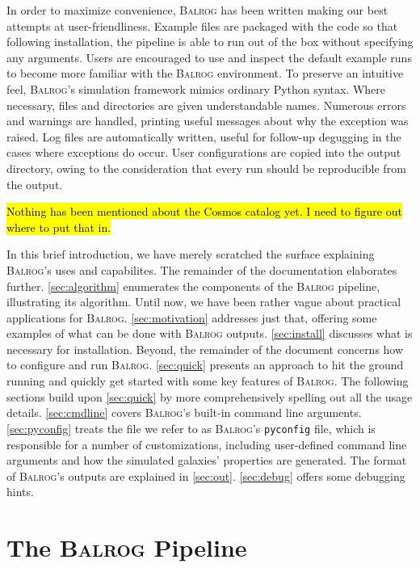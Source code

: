 \documentclass[12pt]{book}
\newcommand{\py}{Python}
\newcommand{\pyconfig}{\texttt{pyconfig}}
\newcommand{\balrog}{\textsc{Balrog}}
\begin{document}
In order to maximize convenience,
\balrog{} has been written making our best attempts at user-friendliness.
Example files are packaged with the code so that following installation,
the pipeline is able to run out of the box without specifying any arguments.
Users are encouraged to use and inspect the default example runs 
to become more familiar with the \balrog{} environment.
To preserve an intuitive feel, \balrog{}'s simulation framework mimics ordinary \py{} syntax. 
Where necessary, files and directories are given understandable names.
Numerous errors and warnings are handled, printing useful messages
about why the exception was raised.
Log files are automatically written, useful for follow-up degugging
in the cases where exceptions do occur. User configurations are copied into
the output directory, owing to the consideration that every run should be
reproducible from the output.

\hl{Nothing has been mentioned about the Cosmos catalog yet. I need to figure out where to put that in.}

In this brief introduction, we have merely scratched the surface explaining \balrog{}'s
uses and capabilites. The remainder of the documentation elaborates further.
\autoref{sec:algorithm} enumerates the components of the \balrog{} pipeline, illustrating its algorithm.
Until now, we have been rather vague about practical applications for \balrog{}.
\autoref{sec:motivation} addresses just that, offering some examples of what can be done with \balrog{} outputs.
\autoref{sec:install} discusses what is necessary for installation.
Beyond, the remainder of the document concerns how to configure and run \balrog{}.
\autoref{sec:quick} presents an approach to hit the ground running and quickly get
started with some key features of \balrog{}.
The following sections build upon \autoref{sec:quick} by more comprehensively spelling out all the usage details.
\autoref{sec:cmdline} covers \balrog{}'s built-in command line arguments.
\autoref{sec:pyconfig} treats the file we refer to as \balrog{}'s \pyconfig{} file, which is responsible for a number of customizations,
including user-defined command line arguments and how the simulated galaxies' properties are generated.
The format of \balrog{}'s outputs are explained in \autoref{sec:out}.
\autoref{sec:debug} offers some debugging hints.


\chapter{The \balrog{} Pipeline}
\label{sec:algorithm}
\end{document}
